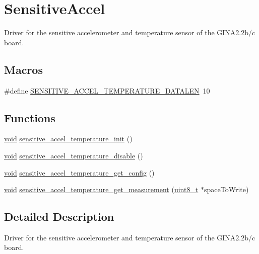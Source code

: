 \hypertarget{group___sensitive_accel}{}\section{Sensitive\+Accel}
\label{group___sensitive_accel}


Driver for the sensitive accelerometer and temperature sensor of the G\+I\+N\+A2.\+2b/c board.  


\subsection*{Macros}
\begin{DoxyCompactItemize}
\item 
\#define \hyperlink{group___sensitive_accel_ga0a039ccacc13e3c6b9602fe326f8f9c8}{S\+E\+N\+S\+I\+T\+I\+V\+E\+\_\+\+A\+C\+C\+E\+L\+\_\+\+T\+E\+M\+P\+E\+R\+A\+T\+U\+R\+E\+\_\+\+D\+A\+T\+A\+L\+EN}~10
\end{DoxyCompactItemize}
\subsection*{Functions}
\begin{DoxyCompactItemize}
\item 
\hyperlink{usb__devapi_8h_afabf60e7f57651d6d595a02c75f07cd0}{void} \hyperlink{group___sensitive_accel_gad51778335adc3ebb1e7fdec942d9a593}{sensitive\+\_\+accel\+\_\+temperature\+\_\+init} ()
\item 
\hyperlink{usb__devapi_8h_afabf60e7f57651d6d595a02c75f07cd0}{void} \hyperlink{group___sensitive_accel_gac79fdc1275031e38d544d304f335c75e}{sensitive\+\_\+accel\+\_\+temperature\+\_\+disable} ()
\item 
\hyperlink{usb__devapi_8h_afabf60e7f57651d6d595a02c75f07cd0}{void} \hyperlink{group___sensitive_accel_ga89505b1ac0acf8ad1447235b9bcf75dc}{sensitive\+\_\+accel\+\_\+temperature\+\_\+get\+\_\+config} ()
\item 
\hyperlink{usb__devapi_8h_afabf60e7f57651d6d595a02c75f07cd0}{void} \hyperlink{group___sensitive_accel_ga2c232ca4832b936306351b0f0c8cd78a}{sensitive\+\_\+accel\+\_\+temperature\+\_\+get\+\_\+measurement} (\hyperlink{_p_e___types_8h_aba7bc1797add20fe3efdf37ced1182c5}{uint8\+\_\+t} $\ast$space\+To\+Write)
\end{DoxyCompactItemize}


\subsection{Detailed Description}
Driver for the sensitive accelerometer and temperature sensor of the G\+I\+N\+A2.\+2b/c board. 

